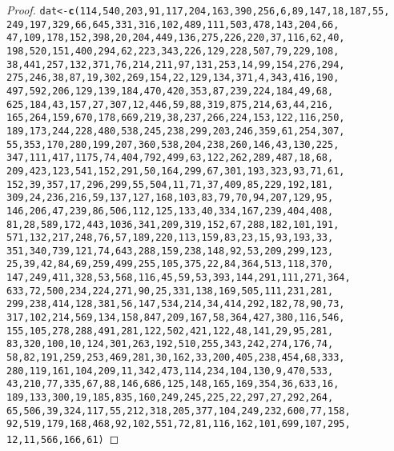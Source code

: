 \documentclass[letterpaper, 12pt]{article}\usepackage{graphicx, color}
\makeatletter
\newcommand{\hlfunctioncall}[1]{\textcolor[rgb]{0.501960784313725,0,0.329411764705882}{\textbf{#1}}}%
\newenvironment{kframe}{%
 \def\at@end@of@kframe{}%
 \ifinner\ifhmode%
  \def\at@end@of@kframe{\end{minipage}}%
  \begin{minipage}{\columnwidth}%
 \fi\fi%
 \def\FrameCommand##1{\hskip\@totalleftmargin \hskip-\fboxsep
 \colorbox{shadecolor}{##1}\hskip-\fboxsep
     \hskip-\linewidth \hskip-\@totalleftmargin \hskip\columnwidth}%
 \MakeFramed {\advance\hsize-\width
   \@totalleftmargin\z@ \linewidth\hsize
   \@setminipage}}%
 {\par\unskip\endMakeFramed%
 \at@end@of@kframe}
\newenvironment{knitrout}{}{} %
\makeatother
\begin{document}
\begin{enumerate}
\begin{enumerate}[(i)]
\begin{proof}
\begin{knitrout}
\color{fgcolor}\begin{kframe}
\begin{alltt}
dat <- \hlfunctioncall{c}(114, 540, 203, 91, 117, 204, 163, 390, 256, 6, 89, 147, 18, 187, 55, 
    249, 197, 329, 66, 645, 331, 316, 102, 489, 111, 503, 478, 143, 204, 66, 
    47, 109, 178, 152, 398, 20, 204, 449, 136, 275, 226, 220, 37, 116, 62, 40, 
    198, 520, 151, 400, 294, 62, 223, 343, 226, 129, 228, 507, 79, 229, 108, 
    38, 441, 257, 132, 371, 76, 214, 211, 97, 131, 253, 14, 99, 154, 276, 294, 
    275, 246, 38, 87, 19, 302, 269, 154, 22, 129, 134, 371, 4, 343, 416, 190, 
    497, 592, 206, 129, 139, 184, 470, 420, 353, 87, 239, 224, 184, 49, 68, 
    625, 184, 43, 157, 27, 307, 12, 446, 59, 88, 319, 875, 214, 63, 44, 216, 
    165, 264, 159, 670, 178, 669, 219, 38, 237, 266, 224, 153, 122, 116, 250, 
    189, 173, 244, 228, 480, 538, 245, 238, 299, 203, 246, 359, 61, 254, 307, 
    55, 353, 170, 280, 199, 207, 360, 538, 204, 238, 260, 146, 43, 130, 225, 
    347, 111, 417, 1175, 74, 404, 792, 499, 63, 122, 262, 289, 487, 18, 68, 
    209, 423, 123, 541, 152, 291, 50, 164, 299, 67, 301, 193, 323, 93, 71, 61, 
    152, 39, 357, 17, 296, 299, 55, 504, 11, 71, 37, 409, 85, 229, 192, 181, 
    309, 24, 236, 216, 59, 137, 127, 168, 103, 83, 79, 70, 94, 207, 129, 95, 
    146, 206, 47, 239, 86, 506, 112, 125, 133, 40, 334, 167, 239, 404, 408, 
    81, 28, 589, 172, 443, 1036, 341, 209, 319, 152, 67, 288, 182, 101, 191, 
    571, 132, 217, 248, 76, 57, 189, 220, 113, 159, 83, 23, 15, 93, 193, 33, 
    351, 340, 739, 121, 74, 643, 288, 159, 238, 148, 92, 53, 209, 299, 123, 
    25, 39, 42, 84, 69, 259, 499, 255, 105, 375, 22, 84, 364, 513, 118, 370, 
    147, 249, 411, 328, 53, 568, 116, 45, 59, 53, 393, 144, 291, 111, 271, 364, 
    633, 72, 500, 234, 224, 271, 90, 25, 331, 138, 169, 505, 111, 231, 281, 
    299, 238, 414, 128, 381, 56, 147, 534, 214, 34, 414, 292, 182, 78, 90, 73, 
    317, 102, 214, 569, 134, 158, 847, 209, 167, 58, 364, 427, 380, 116, 546, 
    155, 105, 278, 288, 491, 281, 122, 502, 421, 122, 48, 141, 29, 95, 281, 
    83, 320, 100, 10, 124, 301, 263, 192, 510, 255, 343, 242, 274, 176, 74, 
    58, 82, 191, 259, 253, 469, 281, 30, 162, 33, 200, 405, 238, 454, 68, 333, 
    280, 119, 161, 104, 209, 11, 342, 473, 114, 234, 104, 130, 9, 470, 533, 
    43, 210, 77, 335, 67, 88, 146, 686, 125, 148, 165, 169, 354, 36, 633, 16, 
    189, 133, 300, 19, 185, 835, 160, 249, 245, 225, 22, 297, 27, 292, 264, 
    65, 506, 39, 324, 117, 55, 212, 318, 205, 377, 104, 249, 232, 600, 77, 158, 
    92, 519, 179, 168, 468, 92, 102, 551, 72, 81, 116, 162, 101, 699, 107, 295, 
    12, 11, 566, 166, 61)


\end{alltt}
\end{kframe}
\end{knitrout}
\end{proof}
\end{enumerate}
\end{enumerate}
\end{document}
